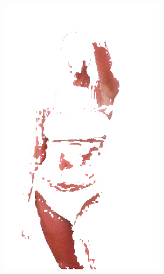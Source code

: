 \begin{figure}[!hbt]
\begin{subfigure}[b]{0.25\textwidth}
         \includegraphics[width=\textwidth]{images/datasets/0487.png}
         \caption{}
         \label{fig:tdsd-gt-skin}
     \end{subfigure}
     \hfill
     \begin{subfigure}[b]{0.4\textwidth}
         \centering

\end{subfigure}
\end{figure}
